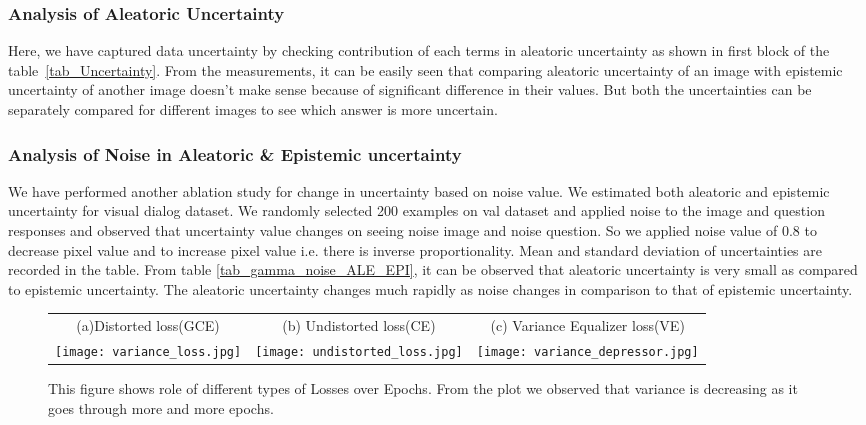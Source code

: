 \documentclass[review]{elsarticle}
\begin{document}
\subsubsection{Analysis of Aleatoric Uncertainty }\label{uncertainit_variants}
Here, we have captured data uncertainty by checking contribution of each terms in aleatoric uncertainty as shown in first block of the table~\ref{tab_Uncertainty}. From the measurements, it can be easily seen that comparing aleatoric uncertainty of an image with epistemic uncertainty of another image doesn't make sense because of significant difference in their values. But both the uncertainties can be separately compared for different images to see which answer is more uncertain. \subsubsection{Analysis of Noise in Aleatoric \& Epistemic uncertainty}\label{gamma_noise}
We have performed another ablation study for change in uncertainty based on noise value. We estimated both aleatoric and epistemic uncertainty for visual dialog dataset. We randomly selected 200 examples on val dataset and applied noise to the image and question responses and observed that uncertainty value changes on seeing noise image and noise question. So we applied noise value  of 0.8 to decrease pixel value and  to increase pixel value i.e. there is inverse proportionality. Mean and standard deviation of uncertainties are recorded in the table. From table \ref{tab_gamma_noise_ALE_EPI}, it can be observed that aleatoric uncertainty is very small as compared to epistemic uncertainty. The aleatoric uncertainty changes much rapidly as noise changes in comparison to that of epistemic uncertainty.
\begin{figure*}[ht]
	\small
	\centering
	\begin{tabular}[b]{ c  c  c}
		(a)Distorted loss(GCE) & (b) Undistorted loss(CE) & (c) Variance Equalizer loss(VE) \\ 
		\texttt{[image: variance\_loss.jpg]}
		& \texttt{[image: undistorted\_loss.jpg]}
		& \texttt{[image: variance\_depressor.jpg]}
	\end{tabular}
	\vspace{-2.2em}
	\caption{This figure shows role of different types of Losses over Epochs. From the plot we observed that variance is decreasing as it goes through more and more epochs.}
	
	\label{fig:result_sup_D}
\end{figure*}
\end{document}
